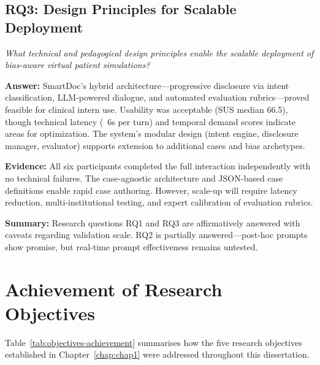 \subsection{RQ3: Design Principles for Scalable Deployment}

\textit{What technical and pedagogical design principles enable the scalable deployment of
bias-aware virtual patient simulations?}

\noindent
\textbf{Answer:} SmartDoc's hybrid architecture—progressive disclosure via intent
classification, LLM-powered dialogue, and automated evaluation rubrics—proved feasible for
clinical intern use. Usability was acceptable (SUS median 66.5), though technical latency
(~6s per turn) and temporal demand scores indicate areas for optimization. The system's
modular design (intent engine, disclosure manager, evaluator) supports extension to
additional cases and bias archetypes.

\noindent
\textbf{Evidence:} All six participants completed the full interaction independently with no
technical failures. The case-agnostic architecture and JSON-based case definitions enable
rapid case authoring. However, scale-up will require latency reduction, multi-institutional
testing, and expert calibration of evaluation rubrics.

\noindent
\textbf{Summary:} Research questions RQ1 and RQ3 are affirmatively answered with caveats
regarding validation scale. RQ2 is partially answered—post-hoc prompts show promise, but
real-time prompt effectiveness remains untested.

\section{Achievement of Research Objectives}
\label{sec:objectives-achieved}

Table~\ref{tab:objectives-achievement} summarises how the five research objectives
established in Chapter~\ref{chap:chap1} were addressed throughout this dissertation.

